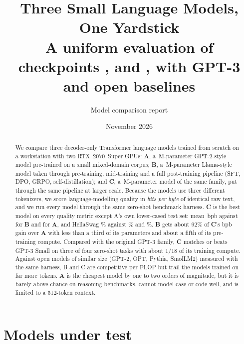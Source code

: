 \documentclass[10pt,a4paper]{article}
\title{\textbf{Three Small Language Models, One Yardstick}\\[2pt]
\large A uniform evaluation of checkpoints \A{}, \B{} and \C{}, with GPT-3 and open baselines}
\author{Model comparison report}
\date{November 2026}
\newcommand{\A}{\textcolor{mA}{\textbf{A}}}
\newcommand{\B}{\textcolor{mB}{\textbf{B}}}
\newcommand{\C}{\textcolor{mC}{\textbf{C}}}
\newcommand{\bpbunit}{\,bpb}
\begin{document}
\maketitle

\begin{abstract}
\noindent We compare three decoder-only Transformer language models trained from scratch on a workstation with two RTX~2070~Super GPUs:
\A{}, a \paramsA\,M-parameter GPT-2-style model pre-trained on a small mixed-domain corpus;
\B{}, a \paramsB\,M-parameter Llama-style model taken through pre-training, mid-training and a full post-training pipeline (SFT, DPO, GRPO, self-distillation); and
\C{}, a \paramsC\,M-parameter model of the same family, put through the same pipeline at larger scale.
Because the models use three different tokenizers, we score language-modelling quality in \emph{bits per byte} of identical raw text, and we run every model through the same zero-shot benchmark harness.
\C{} is the best model on every quality metric except A's own lower-cased test set: mean \meanbpbC\bpbunit{} against \meanbpbB{} for \B{} and \meanbpbA{} for \A{}, and HellaSwag \hellaswagC\% against \hellaswagB\% and \hellaswagA\%.
\B{} gets about 92\% of \C{}'s bpb gain over \A{} with less than a third of its parameters and about a fifth of its pre-training compute.
Compared with the original GPT-3 family, \C{} matches or beats GPT-3 Small on three of four zero-shot tasks with about 1/18 of its training compute. Against open models of similar size (GPT-2, OPT, Pythia, SmolLM2) measured with the same harness, B and C are competitive per FLOP but trail the models trained on far more tokens. \A{} is the cheapest model by one to two orders of magnitude, but it is barely above chance on reasoning benchmarks, cannot model case or code well, and is limited to a 512-token context.
\end{abstract}

\section{Models under test}
\end{document}
